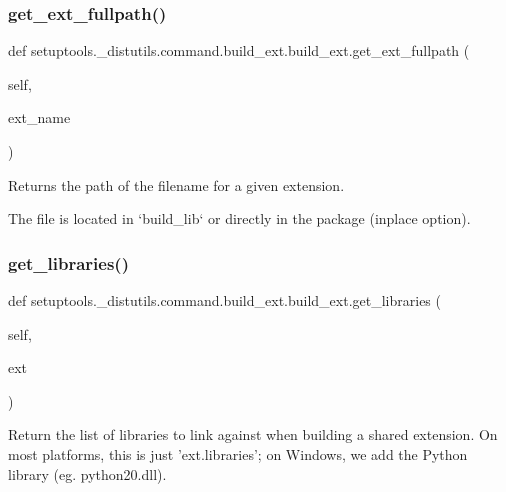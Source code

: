 \subsubsection{\texorpdfstring{get\+\_\+ext\+\_\+fullpath()}{get\_ext\_fullpath()}}
{\footnotesize\ttfamily def setuptools.\+\_\+distutils.\+command.\+build\+\_\+ext.\+build\+\_\+ext.\+get\+\_\+ext\+\_\+fullpath (\begin{DoxyParamCaption}\item[{}]{self,  }\item[{}]{ext\+\_\+name }\end{DoxyParamCaption})}

\begin{DoxyVerb}Returns the path of the filename for a given extension.

The file is located in `build_lib` or directly in the package
(inplace option).
\end{DoxyVerb}
 \mbox{\label{classsetuptools_1_1__distutils_1_1command_1_1build__ext_1_1build__ext_aa16981011f122a07b498a2ec3e14dec0}} 
\subsubsection{\texorpdfstring{get\+\_\+libraries()}{get\_libraries()}}
{\footnotesize\ttfamily def setuptools.\+\_\+distutils.\+command.\+build\+\_\+ext.\+build\+\_\+ext.\+get\+\_\+libraries (\begin{DoxyParamCaption}\item[{}]{self,  }\item[{}]{ext }\end{DoxyParamCaption})}

\begin{DoxyVerb}Return the list of libraries to link against when building a
shared extension.  On most platforms, this is just 'ext.libraries';
on Windows, we add the Python library (eg. python20.dll).
\end{DoxyVerb}
 \mbox{\label{classsetuptools_1_1__distutils_1_1command_1_1build__ext_1_1build__ext_a135f56c739c5ef1325851c6252c70888}} 
